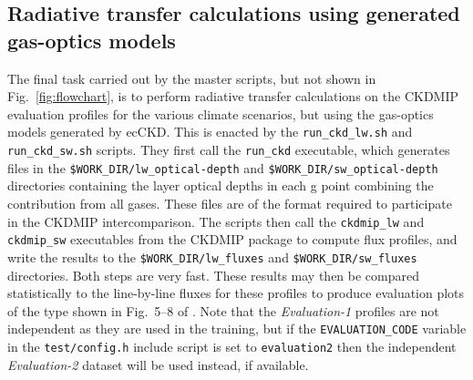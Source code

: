 \documentclass[a4,oneside]{article}
\def\codesize{\small}
\newcommand{\ecckd}{ecCKD}
\def\codesize{\small}
\def\code#1{{\codesize\texttt{#1}}}
\begin{document}
\subsection{Radiative transfer calculations using generated gas-optics models}
\label{sec:rt}
The final task carried out by the master scripts, but not shown in
Fig.\ \ref{fig:flowchart}, is to perform radiative transfer
calculations on the CKDMIP evaluation profiles for the various climate
scenarios, but using the gas-optics models generated by \ecckd. This
is enacted by the \code{run\_ckd\_lw.sh} and \code{run\_ckd\_sw.sh}
scripts. They first call the \code{run\_ckd} executable, which
generates files in the \code{\$WORK\_DIR/lw\_optical-depth} and
\code{\$WORK\_DIR/sw\_optical-depth} directories containing the layer
optical depths in each g point combining the contribution from all
gases.  These files are of the format required to participate in the
CKDMIP intercomparison. The scripts then call the \code{ckdmip\_lw}
and \code{ckdmip\_sw} executables from the CKDMIP package to compute
flux profiles, and write the results to the
\code{\$WORK\_DIR/lw\_fluxes} and \code{\$WORK\_DIR/sw\_fluxes}
directories. Both steps are very fast. These results may then be
compared statistically to the line-by-line fluxes for these profiles
to produce evaluation plots of the type shown in Fig.\ 5--8 of
\cite{Hogan&2020}.  Note that the \emph{Evaluation-1} profiles are not
independent as they are used in the training, but if the
\code{EVALUATION\_CODE} variable in the \code{test/config.h} include
script is set to \code{evaluation2} then the independent
\emph{Evaluation-2} dataset will be used instead, if available.
\end{document}
